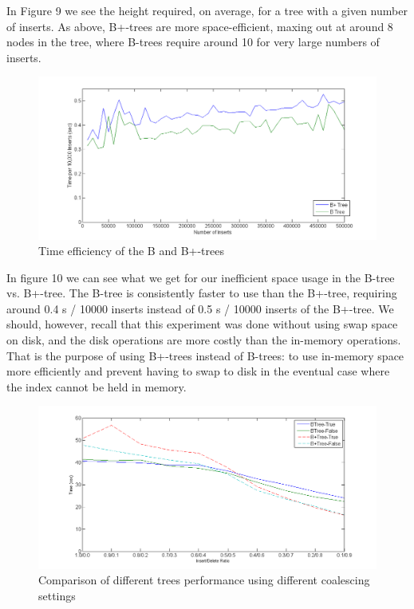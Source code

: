 \documentclass[fleqn]{article}
\begin{document}
In Figure 9 we see the height required, on average, for a tree with a given number of inserts.  As above, B+-trees are more space-efficient, maxing out at around 8 nodes in the tree, where B-trees require around 10 for very large numbers of inserts.\\

\begin{figure}[h!]
\centerline{\includegraphics[width=1.2\linewidth]{Images/figure3.png}}
\caption{Time efficiency of the B and B+-trees}
\end{figure}

In figure 10 we can see what we get for our inefficient space usage in the B-tree vs. B+-tree.  The B-tree is consistently faster to use than the B+-tree, requiring around 0.4 s / 10000 inserts instead of 0.5 s / 10000 inserts of the B+-tree.  We should, however, recall that this experiment was done without using swap space on disk, and the disk operations are more costly than the in-memory operations.  That is the purpose of using B+-trees instead of B-trees: to use in-memory space more efficiently and prevent having to swap to disk in the eventual case where the index cannot be held in memory.\\

\begin{figure}[h!]
\centerline{\includegraphics[width=1.2\linewidth]{Images/figure5.png}}
\caption{Comparison of different trees performance using different coalescing settings}
\end{figure}
\end{document}
